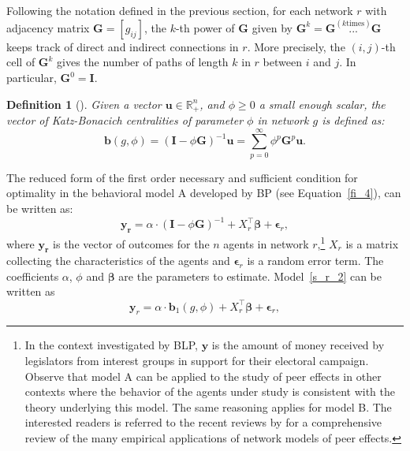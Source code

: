 \documentclass[nojss]{jss}
\newtheorem{definition}{Definition}
\begin{document}
Following the notation defined in the previous section, for each network $r$
with adjacency matrix $\boldsymbol{G}=[g_{ij}]$, the $k$-th power of
$\boldsymbol{G}$ given by $\boldsymbol{G}^{k}=
\boldsymbol{G}\overset{(k\text{times})}{\boldsymbol{...}}\boldsymbol{G}$
keeps track of direct and indirect connections in $r$.  More precisely, the
$(i,j)$-th cell of $\boldsymbol{G}^{k}$ gives the number of paths of length
$k$ in $r$ between $i$ and $j$.  In particular,
$\boldsymbol{G}^{0}=\boldsymbol{I}$.
%
\begin{definition}[\citealp{Katz:1953,Bonacich:1987}] \label{Def1}
%
Given a vector $\boldsymbol{u}\in \mathbb{R}_{+}^{n}$, and $\phi\geq 0$ a
small enough scalar, the vector of Katz-Bonacich centralities of parameter
$\phi$ in network $g$ is defined as:
%
\begin{equation}
\boldsymbol{b}\left( g,\phi \right) =\left( \boldsymbol{I}-\phi
\boldsymbol{G}\right) ^{-1}\boldsymbol{u=}\sum\limits_{p=0}^{\infty}\phi
^{p} \boldsymbol{G}^{p}\boldsymbol{u}.
\label{KB}
\end{equation}
\end{definition}
%
The reduced form of the first order necessary and sufficient condition for
optimality in the behavioral model A developed by BP (see
Equation~\ref{fi_4}), can be written as:
%
\begin{equation}
\mathbf{y}_{\mathbf{r}}=\alpha \cdot \left( \boldsymbol{I}-\phi \boldsymbol{G%
}\right) ^{-1}+X_{r}^\top\mathbf{\beta }+\mathbf{\epsilon }_{r},
\label{s_r_2}
\end{equation}
%
where $\mathbf{y}_{\mathbf{r}}$ is the vector of outcomes for the $n$ agents
in network $r$,\footnote{In the context investigated by BLP, $\mathbf{y}$ is
the amount of money received by legislators from interest groups in support
for their electoral campaign.  Observe that model A can be applied to the
study of peer effects in other contexts where the behavior of the agents
under study is consistent with the theory underlying this model.  The same
reasoning applies for model B.  The interested readers is referred to the
recent reviews by
\cite{An:2011,An:2015a,Jackson+Rogers+Zenou:2017,Hsieh:2020,Zenou:2016} for
a comprehensive review of the many empirical applications of network models
of peer effects.} $X_{r}$ is a matrix collecting the characteristics of the
agents and $\mathbf{\epsilon }_{r}$ is a random error term.  The
coefficients $\alpha $, $\phi $ and $\mathbf{\beta }$ are the parameters to
estimate.  Model~\ref{s_r_2} can be written as
%
\begin{equation*}
\mathbf{y}_{r}=\alpha \cdot \boldsymbol{b}_{1}\left( g,\phi \right)
+X_{r}^\top\mathbf{\beta }+\mathbf{\epsilon }_{r},
\end{equation*}%
\end{document}
